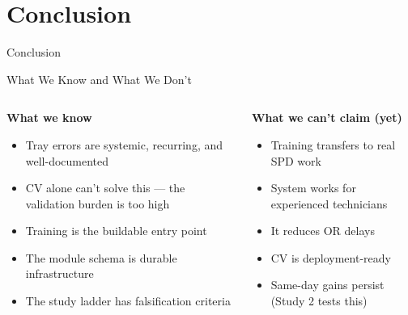 \documentclass[10pt,aspectratio=169]{beamer}
\newcommand{\sectiondivider}[1]{%
  \begin{frame}[plain]
    \centering\vfill
    {\Huge\color{blue!60!black}#1}\par
    \vfill
  \end{frame}
}
\begin{document}
\section{Conclusion}
\sectiondivider{Conclusion}

\begin{frame}{What We Know and What We Don't}
  \begin{columns}[T]
    \begin{exampleblock}{\centering \textbf{What we know}}
      \begin{itemize}
        \item Tray errors are systemic, recurring, and well-documented
        \item CV alone can't solve this — the validation burden is too high
        \item Training is the buildable entry point
        \item The module schema is durable infrastructure
        \item The study ladder has falsification criteria
      \end{itemize}
    \end{exampleblock}
    \begin{alertblock}{\centering \textbf{What we can't claim (yet)}}
      \begin{itemize}
        \item Training transfers to real SPD work
        \item System works for experienced technicians
        \item It reduces OR delays
        \item CV is deployment-ready
        \item Same-day gains persist (Study 2 tests this)
      \end{itemize}
    \end{alertblock}
  \end{columns}
\end{frame}
\end{document}
